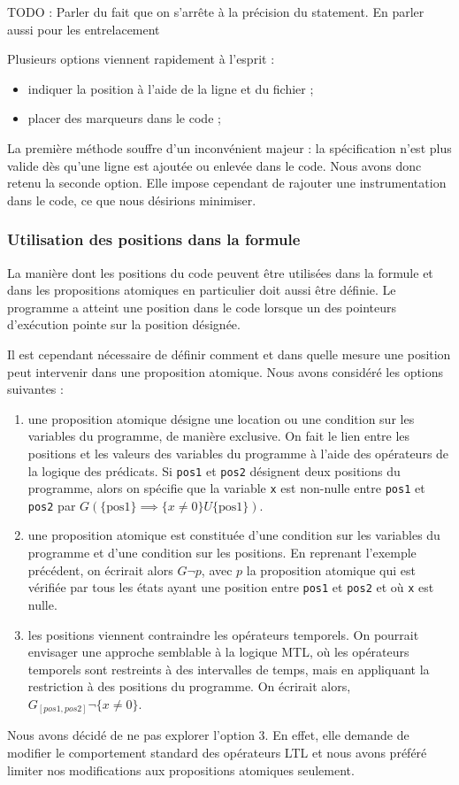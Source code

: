 TODO : Parler du fait que on s'arrête à la précision du statement. En
parler aussi pour les entrelacement

Plusieurs options viennent rapidement à l'esprit :

\begin{itemize}
\item
  indiquer la position à l'aide de la ligne et du fichier ;
\item
  placer des marqueurs dans le code ;
\end{itemize}

La première méthode souffre d'un inconvénient majeur : la spécification
n'est plus valide dès qu'une ligne est ajoutée ou enlevée dans le code.
Nous avons donc retenu la seconde option. Elle impose cependant de
rajouter une instrumentation dans le code, ce que nous désirions
minimiser.

\subsubsection{Utilisation des positions dans la formule}

La manière dont les positions du code peuvent être utilisées dans la
formule et dans les propositions atomiques en particulier doit aussi
être définie. Le programme a atteint une position dans le code lorsque
un des pointeurs d'exécution pointe sur la position désignée.

Il est cependant nécessaire de définir comment et dans quelle mesure une
position peut intervenir dans une proposition atomique. Nous avons
considéré les options suivantes :

\begin{enumerate}
\def\labelenumi{\arabic{enumi})}
\item
  une proposition atomique désigne une location ou une condition sur les
  variables du programme, de manière exclusive. On fait le lien entre les
  positions et les valeurs des variables du programme à l'aide des opérateurs de
  la logique des prédicats. Si \lstinline!pos1! et \lstinline!pos2! désignent
  deux positions du programme, alors on spécifie que la variable \lstinline!x!
  est non-nulle entre \lstinline!pos1! et \lstinline!pos2! par \(G
  (\{\text{pos1}\}\implies \{x \neq 0\} U \{\text{pos1}\})\).
\item
  une proposition atomique est constituée d'une condition sur les variables du
  programme et d'une condition sur les positions. En reprenant l'exemple
  précédent, on écrirait alors \(G \lnot p\), avec \(p\) la proposition atomique
  qui est vérifiée par tous les états ayant une position entre \lstinline!pos1!
  et \lstinline!pos2! et où \lstinline!x! est nulle.
\item
  les positions viennent contraindre les opérateurs temporels. On pourrait
  envisager une approche semblable à la logique MTL\cite{mtl_definition}, où les
  opérateurs temporels sont restreints à des intervalles de temps, mais en
  appliquant la restriction à des positions du programme. On écrirait alors,
  \(G_{[pos1, pos2]} \lnot \{ x \neq 0 \}\).
\end{enumerate}

Nous avons décidé de ne pas explorer l'option 3. En effet, elle demande
de modifier le comportement standard des opérateurs LTL et nous avons
préféré limiter nos modifications aux propositions atomiques seulement.
